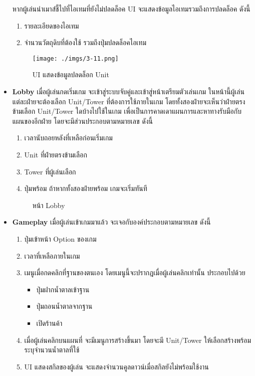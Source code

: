 \documentclass[12pt,oneside,openright,a4paper]{cpe-thai-project}
\begin{document}
\begin{itemize}
  หากผู้เล่นนำเมาส์ชี้ไปที่ไอเทมที่ยังไม่ปลดล็อค UI 
  จะแสดงข้อมูลไอเทมรวมถึงการปลดล็อค ดังนี้
  \begin{enumerate}
    \item รายละเอียดของไอเทม
    \item จำนวนวัตถุดิบที่ต้องใช้ รวมถึงปุ่มปลดล็อคไอเทม
  \end{enumerate}

  \begin{figure}[H]\centering
    \texttt{[image: ./imgs/3-11.png]}
    \caption{UI แสดงข้อมูลปลดล็อก Unit}\label{fig:3-11}
  \end{figure}

  \pagebreak
  \item \textbf{Lobby} เมื่อผู้เล่นกดเริ่มเกม จะเข้าสู่ระบบจับคู่และเข้าสู่หน้าเตรียมตัวเล่นเกม 
  ในหน้านี้ผู้เล่นแต่ละฝ่ายจะต้องเลือก Unit/Tower ที่ต้องการใช้ภายในเกม 
  โดยทั้งสองฝ่ายจะเห็นว่าฝ่ายตรงข้ามเลือก Unit/Tower ใดบ้างไปใช้ในเกม 
  เพื่อเป็นการคาดเดาแผนการและหาทางรับมือกับแผนของอีกฝ่าย โดยจะมีส่วนประกอบตามหมายเลข ดังนี้
  \begin{enumerate}
    \item เวลานับถอยหลังที่เหลือก่อนเริ่มเกม
    \item Unit ที่ฝ่ายตรงข้ามเลือก
    \item Tower ที่ผู้เล่นเลือก
    \item ปุ่มพร้อม ถ้าหากทั้งสองฝ่ายพร้อม เกมจะเริ่มทันที
  \end{enumerate}

  \begin{figure}[H]\centering
    \setlength{\fboxsep}{0cm}
    \caption{หน้า Lobby}\label{fig:3-12}
  \end{figure}
  
  \item \textbf{Gameplay} เมื่อผู้เล่นเข้าเกมมาแล้ว จะเจอกับองค์ประกอบตามหมายเลข ดังนี้
  \begin{enumerate}
    \item ปุ่มเข้าหน้า Option ของเกม
    \item เวลาที่เหลือภายในเกม
    \item เมนูเมื่อกดคลิกที่ฐานของตนเอง โดยเมนูนี้จะปรากฎเมื่อผู้เล่นคลิกเท่านั้น ประกอบไปด้วย
    \begin{itemize}
      \item ปุ่มฝากน้ำตาลเข้าฐาน
      \item ปุ่มถอนน้ำตาลจากฐาน
      \item เปิดร้านค้า
    \end{itemize}
    \item เมื่อผู้เล่นคลิกบนแผนที่ จะมีเมนูการสร้างขึ้นมา 
    โดยจะมี Unit/Tower ให้เลือกสร้างพร้อมระบุจำนวนน้ำตาลที่ใช้
    \item UI แสดงสกิลของผู้เล่น จะแสดงจำนวนคูลดาวน์เมื่อสกิลยังไม่พร้อมใช้งาน
  \end{enumerate}


\end{itemize}
\end{document}
